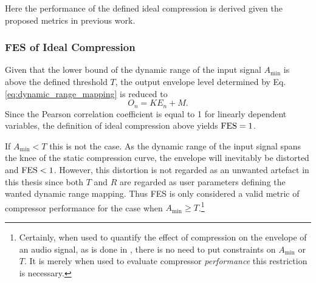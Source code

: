\documentclass[../main2.tex]{subfiles}
\begin{document}
Here the performance of the defined ideal compression is derived given the proposed metrics in previous work.
\subsubsection{FES of Ideal Compression}
Given that the lower bound of the dynamic range of the input signal $A_\text{min}$ is above the defined threshold $T$, the output envelope level determined by Eq.\eqref{eq:dynamic_range_mapping} is reduced to
\begin{equation}
O_n = K E_n + M.
\end{equation}
Since the Pearson correlation coefficient is equal to 1 for linearly dependent variables, the definition of ideal compression above yields $\text{FES}= 1$.

If $A_\text{min} < T$ this is not the case. As the dynamic range of the input signal spans the knee of the static compression curve, the envelope will inevitably be distorted and $\text{FES}< 1$. However, this distortion is not regarded as an unwanted artefact in this thesis since both $T$ and $R$ are regarded as user parameters defining the wanted dynamic range mapping. Thus FES is only considered a valid metric of compressor performance for the case when $A_\text{min} \geq T$.\footnote{Certainly, when used to quantify the effect of compression on the envelope of an audio signal, as is done in \cite{stone2007quantifying}, there is no need to put constraints on $A_\text{min}$ or $T$. It is merely when used to evaluate compressor \emph{performance} this restriction is necessary.}

\end{document}
